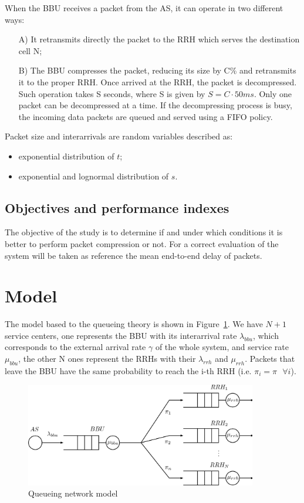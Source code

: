 \documentclass[11pt,a4paper,oneside, openright]{article}
\begin{document}
When the BBU receives a packet from the AS, it can operate in two different ways:
\begin{itemize}
	\item[A)]It retransmits directly the packet to the RRH which serves the destination cell N;
	\item[B)]The BBU compresses the packet, reducing its size by C\% and retransmits it to the proper RRH. Once arrived at the RRH, the packet is decompressed. Such operation takes S seconds, where S is given by $ S = C \cdot 50ms $. Only one packet can be decompressed at a time. If the decompressing process is busy, the incoming data packets are queued and served using a FIFO policy.
\end{itemize}

Packet size and interarrivals are random variables described as:
\begin{itemize}
	\item exponential distribution of $t$;
	\item exponential and lognormal distribution of $s$.
\end{itemize}

\subsection{Objectives and performance indexes}
The objective of the study is to determine if and under which conditions it is better to perform packet compression or not.
For a correct evaluation of the system will be taken as reference the mean end-to-end delay of packets.

\newpage

\section{Model}
The model based to the queueing theory is shown in Figure~\ref{fig:model}.
We have $ N + 1 $ service centers, one represents the BBU with its interarrival rate $ \lambda_{bbu} $, which corresponds to the external arrival rate $ \gamma $ of the whole system, and service rate $ \mu_{bbu} $, the other N ones represent the RRHs with their $ \lambda_{rrh} $ and $ \mu_{rrh} $. Packets that leave the BBU have the same probability to reach the i-th RRH (i.e. $ \pi_{i} = \pi \text{ } \forall i $).
\begin{figure}[h]
	\centering
	\includegraphics[width=0.9\textwidth]{images/model}
	\caption{Queueing network model}
	\label{fig:model}
\end{figure}
\end{document}

